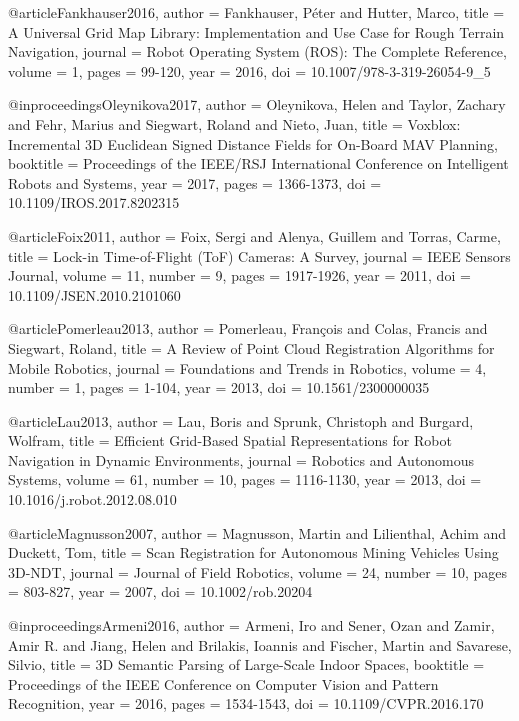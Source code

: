 @article{Fankhauser2016,
  author = {Fankhauser, Péter and Hutter, Marco},
  title = {A Universal Grid Map Library: Implementation and Use Case for Rough Terrain Navigation},
  journal = {Robot Operating System (ROS): The Complete Reference},
  volume = {1},
  pages = {99-120},
  year = {2016},
  doi = {10.1007/978-3-319-26054-9_5}
}

@inproceedings{Oleynikova2017,
  author = {Oleynikova, Helen and Taylor, Zachary and Fehr, Marius and Siegwart, Roland and Nieto, Juan},
  title = {Voxblox: Incremental 3D Euclidean Signed Distance Fields for On-Board MAV Planning},
  booktitle = {Proceedings of the IEEE/RSJ International Conference on Intelligent Robots and Systems},
  year = {2017},
  pages = {1366-1373},
  doi = {10.1109/IROS.2017.8202315}
}

@article{Foix2011,
  author = {Foix, Sergi and Alenya, Guillem and Torras, Carme},
  title = {Lock-in Time-of-Flight (ToF) Cameras: A Survey},
  journal = {IEEE Sensors Journal},
  volume = {11},
  number = {9},
  pages = {1917-1926},
  year = {2011},
  doi = {10.1109/JSEN.2010.2101060}
}

@article{Pomerleau2013,
  author = {Pomerleau, François and Colas, Francis and Siegwart, Roland},
  title = {A Review of Point Cloud Registration Algorithms for Mobile Robotics},
  journal = {Foundations and Trends in Robotics},
  volume = {4},
  number = {1},
  pages = {1-104},
  year = {2013},
  doi = {10.1561/2300000035}
}

@article{Lau2013,
  author = {Lau, Boris and Sprunk, Christoph and Burgard, Wolfram},
  title = {Efficient Grid-Based Spatial Representations for Robot Navigation in Dynamic Environments},
  journal = {Robotics and Autonomous Systems},
  volume = {61},
  number = {10},
  pages = {1116-1130},
  year = {2013},
  doi = {10.1016/j.robot.2012.08.010}
}

@article{Magnusson2007,
  author = {Magnusson, Martin and Lilienthal, Achim and Duckett, Tom},
  title = {Scan Registration for Autonomous Mining Vehicles Using 3D-NDT},
  journal = {Journal of Field Robotics},
  volume = {24},
  number = {10},
  pages = {803-827},
  year = {2007},
  doi = {10.1002/rob.20204}
}

@inproceedings{Armeni2016,
  author = {Armeni, Iro and Sener, Ozan and Zamir, Amir R. and Jiang, Helen and Brilakis, Ioannis and Fischer, Martin and Savarese, Silvio},
  title = {3D Semantic Parsing of Large-Scale Indoor Spaces},
  booktitle = {Proceedings of the IEEE Conference on Computer Vision and Pattern Recognition},
  year = {2016},
  pages = {1534-1543},
  doi = {10.1109/CVPR.2016.170}
}

